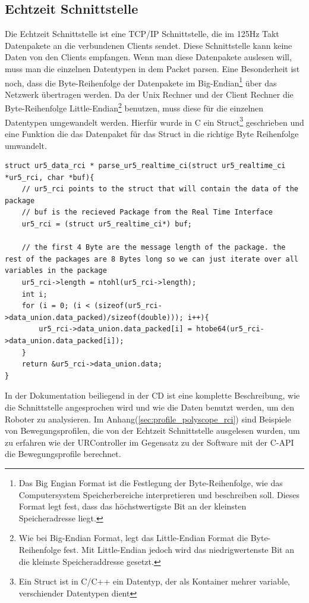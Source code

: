 \subsection{Echtzeit Schnittstelle}
\label{urcontrol_rci_gru}

Die Echtzeit Schnittstelle ist eine \acs{TCP/IP} Schnittstelle, die im 125Hz Takt Datenpakete an die verbundenen Clients sendet. Diese Schnittstelle kann keine Daten von den Clients empfangen. Wenn man diese Datenpakete auslesen will, muss man die einzelnen Datentypen in dem Packet \acs{parsen}. Eine Besonderheit ist noch, dass die Byte-Reihenfolge der Datenpakete im Big-Endian\footnote{Das Big Engian Format ist die Festlegung der Byte-Reihenfolge, wie das Computersystem Speicherbereiche interpretieren und beschreiben soll. Dieses Format legt fest, dass das höchstwertigste Bit an der kleinsten Speicheradresse liegt.} über das Netzwerk übertragen werden. Da der Unix Rechner und der Client Rechner die Byte-Reihenfolge Little-Endian\footnote{Wie bei Big-Endian Format, legt das Little-Endian Format die Byte-Reihenfolge fest. Mit Little-Endian jedoch wird das niedrigwertenste Bit an die kleinste Speicheraddresse gesetzt.} benutzen, muss diese für die einzelnen Datentypen umgewandelt werden. Hierfür wurde in C ein Struct\footnote{Ein Struct ist in C/C++ ein Datentyp, der als Kontainer mehrer variable, verschiender Datentypen dient} geschrieben und eine Funktion die das Datenpaket für das Struct in die richtige Byte Reihenfolge umwandelt.

\begin{lstlisting}[caption={Umwandlung der Byte-Order für Packet über die Echtzeit-Schnittstellen }, label=lst:rci_parse ,captionpos=b]
struct ur5_data_rci * parse_ur5_realtime_ci(struct ur5_realtime_ci *ur5_rci, char *buf){
    // ur5_rci points to the struct that will contain the data of the package
    // buf is the recieved Package from the Real Time Interface
    ur5_rci = (struct ur5_realtime_ci*) buf;

    // the first 4 Byte are the message length of the package. the rest of the packages are 8 Bytes long so we can just iterate over all variables in the package 
    ur5_rci->length = ntohl(ur5_rci->length);
    int i;
    for (i = 0; (i < (sizeof(ur5_rci->data_union.data_packed)/sizeof(double))); i++){
        ur5_rci->data_union.data_packed[i] = htobe64(ur5_rci->data_union.data_packed[i]);
    }
    return &ur5_rci->data_union.data;
}
\end{lstlisting}

In der Dokumentation beiliegend in der CD ist eine komplette Beschreibung, wie die Schnittstelle angesprochen wird und wie die Daten benutzt werden, um den Roboter zu analysieren. Im Anhang(\ref{sec:profile_polyscope_rci}) sind Beispiele von Bewegungsprofilen, die von der Echtzeit Schnittstelle ausgelesen wurden, um zu erfahren wie der URController im Gegensatz zu der Software mit der C-\ac{API} die Bewegungsprofile berechnet.


